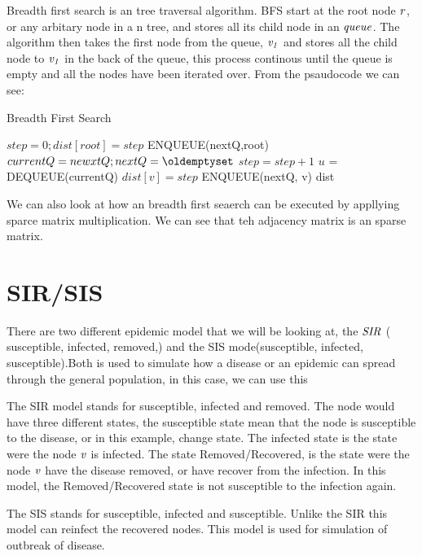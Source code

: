 Breadth first search is an tree traversal algorithm. BFS start at the root node $\it{r}$, or any arbitary node in a n tree, and stores all its child node in an $\it{queue}$. The algorithm then takes the first node from the queue, $\it{v_1}$ and stores all the child node to $\it{v_1}$ in the back of the queue, this process continous until the queue is empty and all the nodes have been iterated over. From the psaudocode we can see:

\begin{algorithm}
\caption{Breadth First Search}
\begin{algorithmic}[1]
\State $step = 0; dist[root] = step$
\State ENQUEUE(nextQ,root)
\State $currentQ = newxtQ; nextQ = \oldemptyset$
\State $step = step+1$
\State$ u$ = DEQUEUE(currentQ)
\State $dist[v] = step$
\State ENQUEUE(nextQ, v)
\EndIf
\EndFor
\EndWhile
\EndWhile
\Return dist
\end{algorithmic}
\end{algorithm}

We can also look at how an breadth first seaerch can be executed by appllying  sparce matrix multiplication. We can see that teh adjacency matrix is an sparse matrix. 



\section{SIR/SIS}
There are two different epidemic model that we will be looking at, the $\it{SIR}$ ( susceptible, infected, removed,) and the SIS mode(susceptible, infected, susceptible).Both is used to simulate how a disease or an epidemic can spread through the general population, in this case, we can use this 

The SIR model stands for susceptible, infected and removed. The node would have three different states, the susceptible state mean that the node is susceptible to the disease, or in this example, change state. The infected state is the state were the node $\it{v}$ is infected. The state Removed/Recovered, is the state were the node $\it{v}$ have the disease removed, or have recover from the infection. In this model, the Removed/Recovered state is not susceptible to the infection again. 

The SIS stands for susceptible, infected and susceptible. Unlike the SIR this model can reinfect the recovered nodes. This model is used for simulation of outbreak of disease. 

